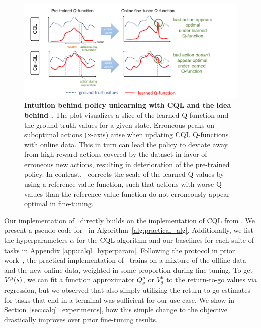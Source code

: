 \begin{figure}
\centering
\vspace{-0.2cm}
\includegraphics[trim={0 0 2.7cm 0},clip,width=0.98\linewidth]{chapters/cal_ql/figs-sample/figure_for_calql_final.pdf}
\vspace{-0.2cm}
\caption{
\footnotesize{\textbf{Intuition behind policy unlearning with CQL and the idea behind \methodname.} The plot visualizes a slice of the learned Q-function and the ground-truth values for a given state. Erroneous peaks on suboptimal actions (x-axis) arise when updating CQL Q-functions with online data. This in turn can lead the policy to deviate away from high-reward actions covered by the dataset in favor of erroneous new actions, resulting in deterioration of the pre-trained policy. In contrast, \methodname\ corrects the scale of the learned Q-values by using a reference value function, such that actions with worse Q-values than the reference value function do not erroneously appear optimal in fine-tuning.}}
\label{fig:calql_idea}
\vspace{-0.4cm}
\end{figure}

 Our implementation of \methodname\ directly builds on the implementation of CQL from \citet{geng2022jaxcql}. We present a pseudo-code for \methodname\ in Algorithm~\ref{alg:practical_alg}. Additionally, we list the hyperparameters $\alpha$ for the CQL algorithm and our baselines for each suite of tasks in Appendix \ref{app:calql_hyperparam}. Following the protocol in prior work~\citep{kostrikov2021offlineb,song2023hybrid}, the practical implementation of \methodname\ trains on a mixture of the offline data and the new online data, weighted in some proportion during fine-tuning. To get $V^\mu(s)$, we can fit a function approximator $Q^\mu_\theta$ or $V^\mu_\theta$ to the return-to-go values via regression, but we observed that also simply utilizing the return-to-go estimates for tasks that end in a terminal was sufficient for our use case. We show in  Section~\ref{sec:calql_experiments}, how this simple change to the objective drastically improves over prior fine-tuning results.

\vspace{-0.2cm}